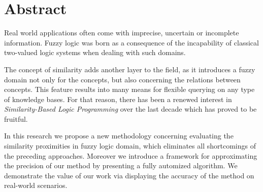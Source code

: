 %


\chapter*{\centering \LARGE{Abstract}}
\label{chap:Abstract}

\small{\indent
Real world applications often come with imprecise, uncertain or incomplete information. Fuzzy logic was born as a consequence of  the incapability of classical two-valued logic systems when dealing with such domains.}

\small{The concept of similarity adds another layer to the field, as it introduces a fuzzy domain not only for the concepts, but also concerning the relations between concepts. This feature results into many means for flexible querying on any type of knowledge bases. For that reason, there has been a renewed interest in \textit{Similarity-Based Logic Programming} over the last decade which has proved to be fruitful.}

\small{In this research we propose a new methodology concerning evaluating the similarity proximities in fuzzy logic domain, which eliminates all shortcomings of the preceding approaches. Moreover we introduce a framework for approximating the precision of our method by presenting a fully automized algorithm.  We demonstrate the value of our work via displaying the accuracy of the method on real-world scenarios.}



%
